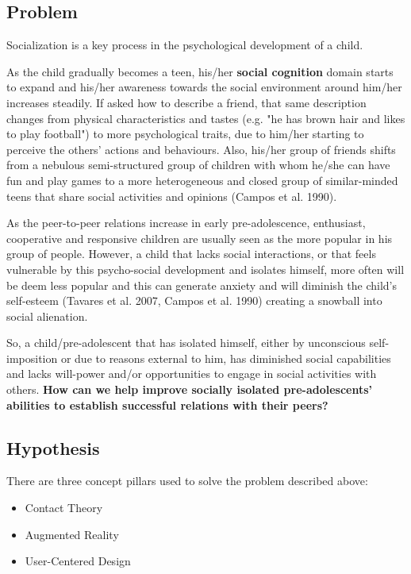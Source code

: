 \documentclass[runningheads]{llncs}
\begin{document}
\subsection{Problem}
Socialization is a key process in the psychological development of a child. 
\par As the child gradually becomes a teen, his/her \textbf{social cognition} domain starts to expand and his/her awareness towards the social environment around him/her increases steadily. If asked how to describe a friend, that same description changes from physical characteristics and tastes (e.g. "he has brown hair and likes to play football") to more psychological traits, due to him/her starting to perceive the others' actions and behaviours. Also, his/her group of friends shifts from a nebulous semi-structured group of children with whom he/she can have fun and play games to a more heterogeneous and closed group of similar-minded teens that share social activities and opinions (Campos et al. 1990). 
\par As the peer-to-peer relations increase in early pre-adolescence, enthusiast, cooperative and responsive children are usually seen as the more popular in his group of people. However, a child that lacks social interactions, or that feels vulnerable by this psycho-social development and isolates himself, more often will be deem less popular and this can generate anxiety and will diminish the child's self-esteem (Tavares et al. 2007, Campos et al. 1990) creating a snowball into social alienation.
\par So, a child/pre-adolescent that has isolated himself, either by unconscious self-imposition or due to reasons external to him, has diminished social capabilities and lacks will-power and/or opportunities to engage in social activities with others.  \textbf{How can we help improve socially isolated pre-adolescents' abilities to establish successful relations with their peers?}

\subsection{Hypothesis}
  
\par There are three concept pillars used to solve the problem described above:
\begin{itemize}[noitemsep]
\item Contact Theory
\item Augmented Reality
\item User-Centered Design
\end{itemize}
\end{document}
